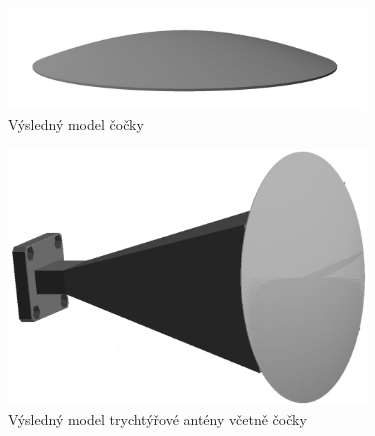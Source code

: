 \begin{figure}[!htbp]
\begin{center}
\includegraphics[width=9.5cm]{pics/LensModel}
\caption{Výsledný model čočky}
\label{fig:LensFinal}
\end{center}
\end{figure}

\begin{figure}[!htbp]
\begin{center}
\includegraphics[width=9.5cm]{pics/HornFinalLens}
\caption{Výsledný model trychtýřové antény včetně čočky}
\label{fig:HornFinalLens}
\end{center}
\end{figure}

